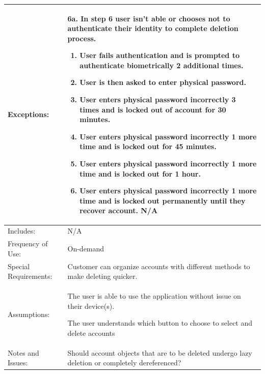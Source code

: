 \documentclass[stu]{apa7}
\newcommand{\nextitem}{\par\hspace*{\labelsep}\textbullet\hspace*{\labelsep}}
\newcommand{\nextitemblank}{\par\hspace*{\labelsep}\hspace*{\labelsep}}
\begin{document}
{\begin{xltabular}{\textwidth}{|l|X|}
  Exceptions: & 
    \nextitemblank 6a. In step 6 user isn't able or chooses not to authenticate their identity to complete deletion process.
      \begin{enumerate}
      \item User fails authentication and is prompted to authenticate biometrically 2 additional times.
      \item User is then asked to enter physical password.
      \item User enters physical password incorrectly 3 times and is locked out of account for 30 minutes.
      \item User enters physical password incorrectly 1 more time and is locked out for 45 minutes.
      \item User enters physical password incorrectly 1 more time and is locked out for 1 hour.
      \item User enters physical password incorrectly 1 more time and is locked out permanently until they recover account. N/A 
      \end{enumerate} \\ \hline
  Includes: & N/A \\ \hline

  Frequency of Use: & On-demand \\ \hline

  Special Requirements: & \nextitem Customer can organize accounts with different methods to make deleting quicker. \\ \hline

  Assumptions: & \nextitem The user is able to use the application without issue on their device(s). \nextitem The user understands which button to choose to select and delete accounts \\ \hline

  Notes and Issues: & \nextitem Should account objects that are to be deleted undergo lazy deletion or completely dereferenced? \\ \hline

\end{xltabular}}

\end{document}
